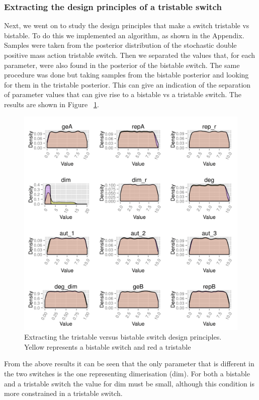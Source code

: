 \subsubsection{Extracting the design principles of a tristable switch}
Next, we went on to study the design principles that make a switch tristable vs bistable. To do this we implemented an algorithm, as shown in the Appendix. Samples were taken from the posterior distribution of the stochastic double positive mass action tristable switch. Then we separated the values that, for each parameter, were also found in the posterior of the bistable switch. The same procedure was done but taking samples from the bistable posterior and looking for them in the tristable posterior. This can give an indication of the separation of parameter values that can give rise to a bistable vs a tristable switch. The results are shown in Figure ~\ref{fig:design_pr_ma_dp}.

\begin{figure}[h!]
\begin{center}
\includegraphics[scale=0.2]{chapterModelling/mass_action_switches/bi_tri_same_priors/design_principles_pos_ab.png}
\caption{Extracting the tristable versus bistable switch design principles. Yellow represents a bistable switch and red a tristable}\label{fig:design_pr_ma_dp}
\end{center}
\end{figure}

From the above results it can be seen that the only parameter that is different in the two switches is the one representing dimerisation (dim). For both a bistable and a tristable switch the value for dim must be small, although this condition is more constrained in a tristable switch.

